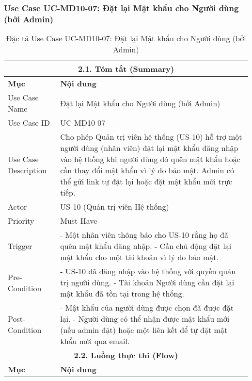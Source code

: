 \subsubsection{Use Case UC-MD10-07: Đặt lại Mật khẩu cho Người dùng (bởi Admin)}
\begin{longtable}{|m{4cm}|p{11cm}|}
\caption{Đặc tả Use Case UC-MD10-07: Đặt lại Mật khẩu cho Người dùng (bởi Admin)} \label{tab:uc_md10_07_full_v2_latex_fixed_in_codeblock} \\
\hline
\multicolumn{2}{|c|}{\textbf{2.1. Tóm tắt (Summary)}} \\
\hline
\textbf{Mục} & \textbf{Nội dung} \\
\hline
\endhead %
\midrule
\endfoot %
\bottomrule
\endlastfoot %
Use Case Name & Đặt lại Mật khẩu cho Người dùng (bởi Admin) \\
\hline
Use Case ID & UC-MD10-07 \\
\hline
Use Case Description & Cho phép Quản trị viên hệ thống (US-10) hỗ trợ một người dùng (nhân viên) đặt lại mật khẩu đăng nhập vào hệ thống khi người dùng đó quên mật khẩu hoặc cần thay đổi mật khẩu vì lý do bảo mật. Admin có thể gửi link tự đặt lại hoặc đặt mật khẩu mới trực tiếp. \\
\hline
Actor & US-10 (Quản trị viên Hệ thống) \\
\hline
Priority & Must Have \\
\hline
Trigger & - Một nhân viên thông báo cho US-10 rằng họ đã quên mật khẩu đăng nhập. \newline - Cần chủ động đặt lại mật khẩu cho một tài khoản vì lý do bảo mật. \\
\hline
Pre-Condition & - US-10 đã đăng nhập vào hệ thống với quyền quản trị người dùng. \newline - Tài khoản Người dùng cần đặt lại mật khẩu đã tồn tại trong hệ thống. \\
\hline
Post-Condition & - Mật khẩu của người dùng được chọn đã được đặt lại. \newline - Người dùng có thể nhận được mật khẩu mới (nếu admin đặt) hoặc một liên kết để tự đặt mật khẩu mới qua email. \\
\hline
\multicolumn{2}{|c|}{\textbf{2.2. Luồng thực thi (Flow)}} \\
\hline
\textbf{Mục} & \textbf{Nội dung} \\
\hline

\end{longtable}

